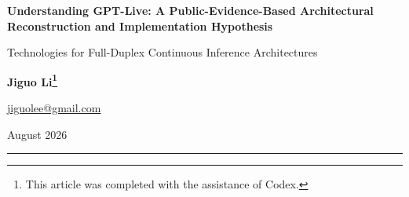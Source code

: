 \documentclass[UTF8,fontset=none,a4paper,10pt]{ctexart}
\renewcommand{\abstractname}{Abstract}
\renewcommand{\contentsname}{Contents}
\renewcommand{\figurename}{Figure}
\renewcommand{\tablename}{Table}
\renewcommand{\refname}{References}
\renewcommand{\appendixname}{Appendix}
\def\BilingualTocExtension{entoc}
\newcommand{\BilingualUseEnglishToc}{\gdef\BilingualTocExtension{entoc}}
\def\BilingualAnchorPrefix{en}
\begin{document}
\renewcommand{\abstractname}{Abstract}
\renewcommand{\contentsname}{Contents}
\renewcommand{\figurename}{Figure}
\renewcommand{\tablename}{Table}
\renewcommand{\refname}{References}
\renewcommand{\appendixname}{Appendix}
\BilingualUseEnglishToc
\renewcommand*{\theHsection}{en.\arabic{section}}
\renewcommand*{\theHsubsection}{en.\arabic{section}.\arabic{subsection}}
\renewcommand*{\theHsubsubsection}{en.\arabic{section}.\arabic{subsection}.\arabic{subsubsection}}
\renewcommand*{\theHequation}{en.\arabic{equation}}
\renewcommand*{\theHfigure}{en.\arabic{figure}}
\renewcommand*{\theHtable}{en.\arabic{table}}
\gdef\BilingualAnchorPrefix{en}
\markboth{}{}
\begin{center}
 {\bfseries\color{navy} Understanding GPT-Live: A Public-Evidence-Based Architectural Reconstruction and Implementation Hypothesis}\par
  \vspace{4pt}
 {\color{navy} Technologies for Full-Duplex Continuous Inference Architectures}\par
  \vspace{10pt}
 {\normalsize\textbf{Jiguo Li\footnote{This article was completed with the assistance of Codex.}}}\par
  \vspace{2pt}
  {\small\href{mailto:jiguolee@gmail.com}{jiguolee@gmail.com}}\par
  \vspace{2pt}
{\small August 2026}
\end{center}
\vspace{5pt}
\hrule
\end{document}
